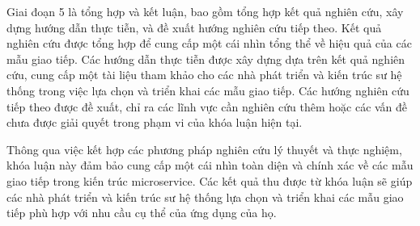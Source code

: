 Giai đoạn 5 là tổng hợp và kết luận, bao gồm tổng hợp kết quả nghiên cứu, xây dựng hướng dẫn thực tiễn, và đề xuất hướng nghiên cứu tiếp theo. Kết quả nghiên cứu được tổng hợp để cung cấp một cái nhìn tổng thể về hiệu quả của các mẫu giao tiếp. Các hướng dẫn thực tiễn được xây dựng dựa trên kết quả nghiên cứu, cung cấp một tài liệu tham khảo cho các nhà phát triển và kiến trúc sư hệ thống trong việc lựa chọn và triển khai các mẫu giao tiếp. Các hướng nghiên cứu tiếp theo được đề xuất, chỉ ra các lĩnh vực cần nghiên cứu thêm hoặc các vấn đề chưa được giải quyết trong phạm vi của khóa luận hiện tại.

Thông qua việc kết hợp các phương pháp nghiên cứu lý thuyết và thực nghiệm, khóa luận này đảm bảo cung cấp một cái nhìn toàn diện và chính xác về các mẫu giao tiếp trong kiến trúc microservice. Các kết quả thu được từ khóa luận sẽ giúp các nhà phát triển và kiến trúc sư hệ thống lựa chọn và triển khai các mẫu giao tiếp phù hợp với nhu cầu cụ thể của ứng dụng của họ. 